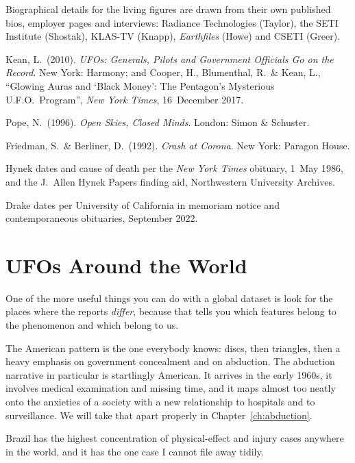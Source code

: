 \begin{srcnotes}
\item Biographical details for the living figures are drawn from their own published
bios, employer pages and interviews: Radiance Technologies (Taylor), the SETI Institute
(Shostak), KLAS-TV (Knapp), \emph{Earthfiles} (Howe) and CSETI (Greer).
\item Kean, L.\ (2010). \emph{UFOs: Generals, Pilots and Government Officials Go on the
Record}. New York: Harmony; and Cooper, H., Blumenthal, R.\ \& Kean, L., ``Glowing Auras
and `Black Money': The Pentagon's Mysterious U.F.O.\ Program'', \emph{New York Times},
16~December 2017.
\item Pope, N.\ (1996). \emph{Open Skies, Closed Minds}. London: Simon \& Schuster.
\item Friedman, S.\ \& Berliner, D.\ (1992). \emph{Crash at Corona}. New York: Paragon
House.
\item Hynek dates and cause of death per the \emph{New York Times} obituary, 1~May 1986,
and the J.~Allen Hynek Papers finding aid, Northwestern University Archives.
\item Drake dates per University of California in memoriam notice and contemporaneous
obituaries, September 2022.
\end{srcnotes}

\section{UFOs Around the World}\label{sec:ufosaroundworld}

One of the more useful things you can do with a global dataset is look for the places
where the reports \emph{differ}, because that tells you which features belong to the
phenomenon and which belong to us.

The American pattern is the one everybody knows: discs, then triangles, then a heavy
emphasis on government concealment and on abduction. The abduction narrative in
particular is startlingly American. It arrives in the early 1960s, it involves medical
examination and missing time, and it maps almost too neatly onto the anxieties of a
society with a new relationship to hospitals and to surveillance. We will take that apart
properly in Chapter~\ref{ch:abduction}.

Brazil has the highest concentration of physical-effect and injury cases anywhere in the
world, and it has the one case I cannot file away tidily.

